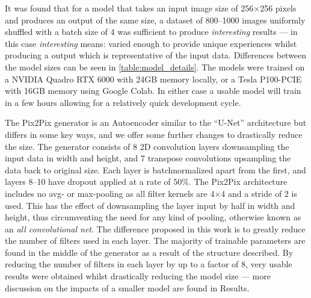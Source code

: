 \documentclass{article}
\begin{document}
It was found that for a model that takes an input image size of 256$\times$256 pixels and produces an output of the same size, a dataset of 800--1000 images uniformly shuffled with a batch size of 4 was sufficient to produce \textit{interesting} results --- in this case \textit{interesting} means: varied enough to provide unique experiences whilst producing a output which is representative of the input data. Differences between the model sizes can be seen in \ref{table:model_details}. The models were trained on a NVIDIA Quadro RTX 6000 with 24GB memory locally, or a Tesla P100-PCIE with 16GB memory using Google Colab. In either case a usable model will train in a few hours allowing for a relatively quick development cycle. %

The Pix2Pix generator is an Autoencoder similar to the ``U-Net'' architecture\cite{1505.04597} but differs in some key ways, and we offer some further changes to drastically reduce the size. The generator consists of 8 2D convolution layers downsampling the input data in width and height, and 7 transpose convolutions upsampling the data back to original size. Each layer is batchnormalized\cite{1502.03167} apart from the first, and layers 8--10 have dropout\cite{JMLR:v15:srivastava14a} applied at a rate of 50\%. The Pix2Pix architecture includes no avg- or max-pooling as all filter kernels are 4$\times$4 and a stride of 2 is used. This has the effect of downsampling the layer input by half in width and height, thus circumventing the need for any kind of pooling, otherwise known as an \textit{all convolutional net}\cite{1412.6806}. The difference proposed in this work is to greatly reduce the number of filters used in each layer. The majority of trainable parameters are found in the middle of the generator as a result of the structure described. By reducing the number of filters in each layer by up to a factor of 8, very usable results were obtained whilst drastically reducing the model size --- more discussion on the impacts of a smaller model are found in Results.
\end{document}
